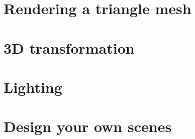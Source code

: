 \section{Rendering a triangle mesh}

\section{3D transformation}

\section{Lighting}

\section{Design your own scenes}

%
%


